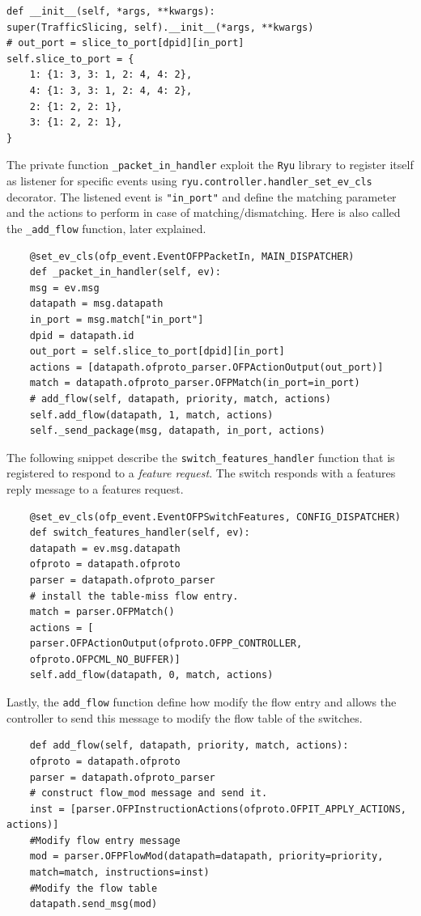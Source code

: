 \documentclass[10pt,a4paper]{report}
\theoremstyle{definition}
\begin{document}
\begin{lstlisting}
def __init__(self, *args, **kwargs):
super(TrafficSlicing, self).__init__(*args, **kwargs)
# out_port = slice_to_port[dpid][in_port]
self.slice_to_port = {
	1: {1: 3, 3: 1, 2: 4, 4: 2},
	4: {1: 3, 3: 1, 2: 4, 4: 2},
	2: {1: 2, 2: 1},
	3: {1: 2, 2: 1},
}
\end{lstlisting}

The private function \texttt{\_packet\_in\_handler} exploit the \texttt{Ryu} library to register itself as listener for specific events using \texttt{ryu.controller.handler\_set\_ev\_cls} decorator. The listened event is \texttt{"in\_port"} and define the matching parameter and the actions to perform in case of matching/dismatching. Here is also called the \texttt{\_add\_flow} function, later explained.

\begin{lstlisting}
	@set_ev_cls(ofp_event.EventOFPPacketIn, MAIN_DISPATCHER)
	def _packet_in_handler(self, ev):
	msg = ev.msg
	datapath = msg.datapath
	in_port = msg.match["in_port"]
	dpid = datapath.id
	out_port = self.slice_to_port[dpid][in_port]
	actions = [datapath.ofproto_parser.OFPActionOutput(out_port)]
	match = datapath.ofproto_parser.OFPMatch(in_port=in_port)
	# add_flow(self, datapath, priority, match, actions)
	self.add_flow(datapath, 1, match, actions)
	self._send_package(msg, datapath, in_port, actions)
\end{lstlisting}


The following snippet describe the \texttt{switch\_features\_handler} function that is registered to respond to a \textit{feature request}. The switch responds with a features reply message to a features request. 

\begin{lstlisting}
	@set_ev_cls(ofp_event.EventOFPSwitchFeatures, CONFIG_DISPATCHER)
	def switch_features_handler(self, ev):
	datapath = ev.msg.datapath
	ofproto = datapath.ofproto
	parser = datapath.ofproto_parser
	# install the table-miss flow entry.
	match = parser.OFPMatch()
	actions = [
	parser.OFPActionOutput(ofproto.OFPP_CONTROLLER,
	ofproto.OFPCML_NO_BUFFER)]
	self.add_flow(datapath, 0, match, actions) 
\end{lstlisting}
Lastly, the \texttt{add\_flow} function define how modify the flow entry and allows the controller to send this message to modify the flow table of the switches.
\begin{lstlisting}
	def add_flow(self, datapath, priority, match, actions):
	ofproto = datapath.ofproto
	parser = datapath.ofproto_parser
	# construct flow_mod message and send it.
	inst = [parser.OFPInstructionActions(ofproto.OFPIT_APPLY_ACTIONS, actions)]
	#Modify flow entry message
	mod = parser.OFPFlowMod(datapath=datapath, priority=priority,
	match=match, instructions=inst)
	#Modify the flow table
	datapath.send_msg(mod)
\end{lstlisting}
\end{document}
